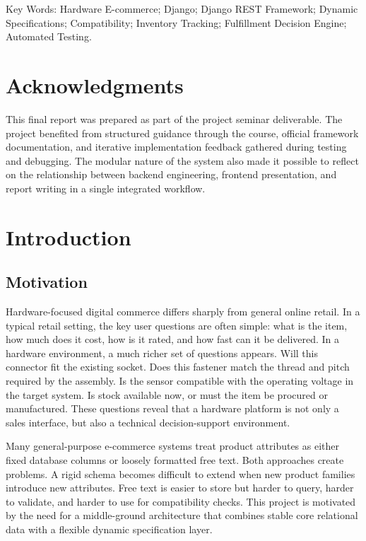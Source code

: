 \documentclass[12pt,letterpaper,oneside,openany]{book}
\begin{document}
\noindent
Key Words: Hardware E-commerce; Django; Django REST Framework; Dynamic
Specifications; Compatibility; Inventory Tracking; Fulfillment Decision Engine;
Automated Testing.

\chapter*{Acknowledgments}

\begin{justifying}
This final report was prepared as part of the project seminar deliverable. The
project benefited from structured guidance through the course, official
framework documentation, and iterative implementation feedback gathered during
testing and debugging. The modular nature of the system also made it possible
to reflect on the relationship between backend engineering, frontend
presentation, and report writing in a single integrated workflow.
\end{justifying}

\tableofcontents
\listoffigures
\listoftables
\lstlistoflistings

\mainmatter

\chapter{Introduction}

\section{Motivation}

\begin{justifying}
Hardware-focused digital commerce differs sharply from general online retail.
In a typical retail setting, the key user questions are often simple: what is
the item, how much does it cost, how is it rated, and how fast can it be
delivered. In a hardware environment, a much richer set of questions appears.
Will this connector fit the existing socket. Does this fastener match the
thread and pitch required by the assembly. Is the sensor compatible with the
operating voltage in the target system. Is stock available now, or must the
item be procured or manufactured. These questions reveal that a hardware
platform is not only a sales interface, but also a technical decision-support
environment.
\end{justifying}

\begin{justifying}
Many general-purpose e-commerce systems treat product attributes as either fixed
database columns or loosely formatted free text. Both approaches create
problems. A rigid schema becomes difficult to extend when new product families
introduce new attributes. Free text is easier to store but harder to query,
harder to validate, and harder to use for compatibility checks. This project is
motivated by the need for a middle-ground architecture that combines stable core
relational data with a flexible dynamic specification layer.
\end{justifying}
\end{document}
